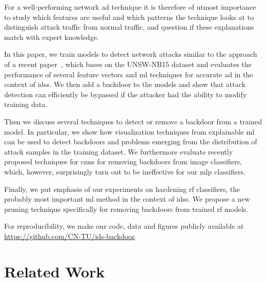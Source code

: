 \documentclass[9pt,sigconf,letterpaper,dvipsnames\ifx\removeHeaders\tempYes ,nonacm\fi]{acmart}
\newcommand{\unsw}{UNSW-NB15}
\begin{document}
For a well-performing network \gls{ad} technique it is therefore of utmost importance to study which features are useful and which patterns the technique looks at to distinguish attack traffic from normal traffic, and question if these explanations match with expert knowledge.

In this paper, we train models to detect network attacks similar to the approach of a recent paper~\cite{meghdouri_analysis_2018}, which bases on the \unsw{} dataset \cite{moustafa_unsw-nb15:_2015} and evaluates the performance of several feature vectors and \gls{ml} techniques for accurate \gls{ad} in the context of \glspl{ids}.
We then add a backdoor to the models and show that attack detection can efficiently be bypassed if the attacker had the ability to modify training data.

Then we discuss several techniques to detect or remove a backdoor from a trained model. In particular, we show how visualization techniques from explainable \gls{ml} can be used to detect backdoors and problems emerging from the distribution of attack samples in the training dataset.
We furthermore evaluate recently proposed techniques for \glspl{cnn} for removing backdoors from image classifiers, which, however, surprisingly turn out to be ineffective for our \gls{mlp} classifiers.


Finally, we put emphasis of our experiments on hardening \gls{rf} classifiers, the probably most important \gls{ml} method in the context of \glspl{ids}.
We propose a new pruning technique specifically for removing backdoors from trained \gls{rf} models.

For reproducibility, we make our code, data and figures publicly available at \url{https://github.com/CN-TU/ids-backdoor}.

\section{Related Work}
\end{document}
